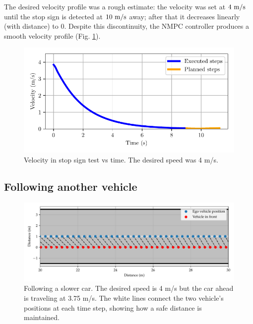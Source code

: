 \documentclass[letterpaper, 10 pt, conference]{ieeeconf}  %
\begin{document}
The desired velocity profile was a rough estimate: the velocity was set at $4\ \text{m}/\text{s}$ until the stop sign is detected at $10\ \text{m}/\text{s}$ away; after that it decreases linearly (with distance) to 0. Despite this discontinuity, the NMPC controller produces a smooth velocity profile (Fig. \ref{fig:stop_sign_velocity}).
 
 \begin{figure}[h!]
 	\centering
 	\includegraphics[width=0.9\linewidth]{figures/stop_sign_velocity.pdf}
 	\vspace{-1em}
 	\caption{Velocity in stop sign test vs time. The desired speed was 4 m/s.} 	 	\label{fig:stop_sign_velocity}
 \end{figure}
 
  \subsection{Following another vehicle}
 
 
 \begin{figure}[h!]
 	\centering
 	\includegraphics[width=1.0\linewidth]{figures/vehicle_following.pdf}
 	 	\vspace{-1.5em}
 	\caption{Following a slower car. The desired speed is 4 m/s but the car ahead is traveling at 3.75 m/s. The white lines connect the two vehicle's positions at each time step, showing how a safe distance is maintained.}
        \label{fig:vehicle_following}
 \end{figure}
 
\end{document}
